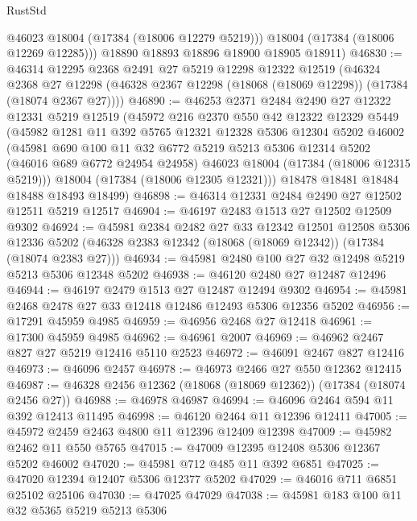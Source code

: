 \begin{lexlean}{RustStd}
\begin{coremodule}
          @46023
          @18004
          (@17384 (@18006 @12279 @5219)))
        @18004
        (@17384 (@18006 @12269 @12285)))
      @18890
      @18893
      @18896
      @18900
      @18905
      @18911)
@46830 := @46314
    @12295
    @2368
    @2491
    @27
    @5219
    @12298
    @12322
    @12519
    (@46324
      @2368
      @27
      @12298
      (@46328 @2367 @12298 (@18068 (@18069 @12298)) (@17384 (@18074 @2367 @27))))
@46890 := @46253
    @2371
    @2484
    @2490
    @27
    @12322
    @12331
    @5219
    @12519
    (@45972
      @216
      @2370
      @550
      @42
      @12322
      @12329
      @5449
      (@45982
        @1281
        @11
        @392
        @5765
        @12321
        @12328
        @5306
        @12304
        @5202
        @46002
        (@45981
          @690
          @100
          @11
          @32
          @6772
          @5219
          @5213
          @5306
          @12314
          @5202
          (@46016 @689 @6772 @24954 @24958)
          @46023
          @18004
          (@17384 (@18006 @12315 @5219)))
        @18004
        (@17384 (@18006 @12305 @12321)))
      @18478
      @18481
      @18484
      @18488
      @18493
      @18499)
@46898 := @46314 @12331 @2484 @2490 @27 @12502 @12511 @5219 @12517
@46904 := @46197 @2483 @1513 @27 @12502 @12509 @9302
@46924 := @45981
    @2384
    @2482
    @27
    @33
    @12342
    @12501
    @12508
    @5306
    @12336
    @5202
    (@46328 @2383 @12342 (@18068 (@18069 @12342)) (@17384 (@18074 @2383 @27)))
@46934 := @45981 @2480 @100 @27 @32 @12498 @5219 @5213 @5306 @12348 @5202
@46938 := @46120 @2480 @27 @12487 @12496
@46944 := @46197 @2479 @1513 @27 @12487 @12494 @9302
@46954 := @45981 @2468 @2478 @27 @33 @12418 @12486 @12493 @5306 @12356 @5202
@46956 := @17291 @45959 @4985
@46959 := @46956 @2468 @27 @12418
@46961 := @17300 @45959 @4985
@46962 := @46961 @2007
@46969 := @46962 @2467 @827 @27 @5219 @12416 @5110 @2523
@46972 := @46091 @2467 @827 @12416
@46973 := @46096 @2457
@46978 := @46973 @2466 @27 @550 @12362 @12415
@46987 := @46328 @2456 @12362 (@18068 (@18069 @12362)) (@17384 (@18074 @2456 @27))
@46988 := @46978 @46987
@46994 := @46096 @2464 @594 @11 @392 @12413 @11495
@46998 := @46120 @2464 @11 @12396 @12411
@47005 := @45972 @2459 @2463 @4800 @11 @12396 @12409 @12398
@47009 := @45982 @2462 @11 @550 @5765
@47015 := @47009 @12395 @12408 @5306 @12367 @5202 @46002
@47020 := @45981 @712 @485 @11 @392 @6851
@47025 := @47020 @12394 @12407 @5306 @12377 @5202
@47029 := @46016 @711 @6851 @25102 @25106
@47030 := @47025 @47029
@47038 := @45981 @183 @100 @11 @32 @5365 @5219 @5213 @5306

\end{coremodule}
\end{lexlean}
